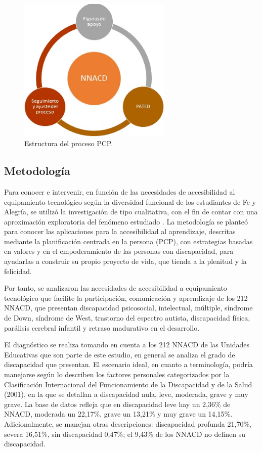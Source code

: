 \documentclass[spanish]{textolivre}
\begin{document}
\begin{figure}[h!]
 \centering
 \includegraphics[width=0.65\textwidth]{Figura 1.png}
 \caption{Estructura del proceso PCP.}
 \label{fig01}
\end{figure}

\subsection{Metodología}\label{sec-normas}
Para conocer e intervenir, en función de las necesidades de accesibilidad al equipamiento tecnológico según la diversidad funcional de los estudiantes de Fe y Alegría, se utilizó la investigación de tipo cualitativa, con el fin de contar con una aproximación exploratoria del fenómeno estudiado \cite{hernandez_sampieri_metodologiinvestigacion_2014}. La metodología se planteó para conocer las aplicaciones para la accesibilidad al aprendizaje, descritas mediante la planificación centrada en la persona (PCP), con estrategias basadas en valores y en el empoderamiento de las personas con discapacidad, para ayudarlas a construir su propio proyecto de vida, que tienda a la plenitud y la felicidad.

Por tanto, se analizaron las necesidades de accesibilidad a equipamiento tecnológico que facilite la participación, comunicación y aprendizaje de los 212 NNACD, que presentan discapacidad psicosocial, intelectual, múltiple, síndrome de Down, síndrome de West, trastorno del espectro autista, discapacidad física, parálisis cerebral infantil y retraso madurativo en el desarrollo.

El diagnóstico se realiza tomando en cuenta a los 212 NNACD de las Unidades Educativas que son parte de este estudio, en general se analiza el grado de discapacidad que presentan. El escenario ideal, en cuanto a terminología, podría manejarse según lo describen los factores personales categorizados por la Clasificación Internacional del Funcionamiento de la Discapacidad y de la Salud (2001), en la que se detallan a discapacidad nula, leve, moderada, grave y muy grave. La base de datos refleja que en discapacidad leve hay un 2,36\% de NNACD, moderada un 22,17\%, grave un 13,21\% y muy grave un 14,15\%. Adicionalmente, se manejan otras descripciones:  discapacidad profunda 21,70\%, severa 16,51\%, sin discapacidad 0,47\%; el 9,43\% de los NNACD no definen su discapacidad.
\end{document}
